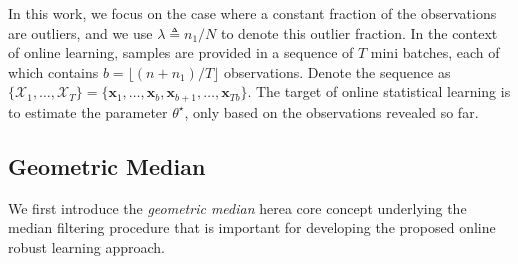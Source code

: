 \documentclass[11pt]{article}
\newtheorem{remark}{Remark}
\begin{document}
In this work, we focus on the  case where a constant fraction of the observations are outliers, and  we use $\lambda \triangleq {n_1}/N$ to denote this  outlier fraction. 
In the context of online learning, samples are provided in a sequence of $ T $ mini batches, each of which contains $ b = \lfloor (n+n_1)/T \rfloor $ observations. Denote the sequence as $  \{\mathcal{X}_1,\ldots,\mathcal{X}_T\} = \{\mathbf{x}_1,\ldots,\mathbf{x}_b, \mathbf{x}_{b+1},\ldots, \mathbf{x}_{Tb}\} $. The target of online statistical learning is to estimate the parameter $ \theta^\star $, only based on the observations revealed so far. 


\subsection{Geometric Median}
We first introduce the \emph{geometric median} here\textemdash a core concept underlying the median filtering procedure that is important for developing the proposed online robust learning approach.
\end{document}
